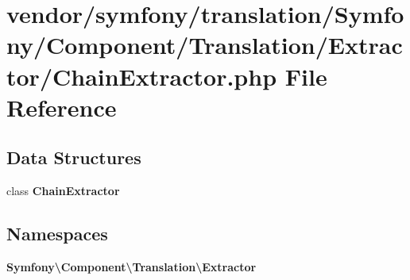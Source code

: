 \section{vendor/symfony/translation/\+Symfony/\+Component/\+Translation/\+Extractor/\+Chain\+Extractor.php File Reference}
\label{_chain_extractor_8php}
\subsection*{Data Structures}
\begin{DoxyCompactItemize}
\item 
class {\bf Chain\+Extractor}
\end{DoxyCompactItemize}
\subsection*{Namespaces}
\begin{DoxyCompactItemize}
\item 
 {\bf Symfony\textbackslash{}\+Component\textbackslash{}\+Translation\textbackslash{}\+Extractor}
\end{DoxyCompactItemize}
